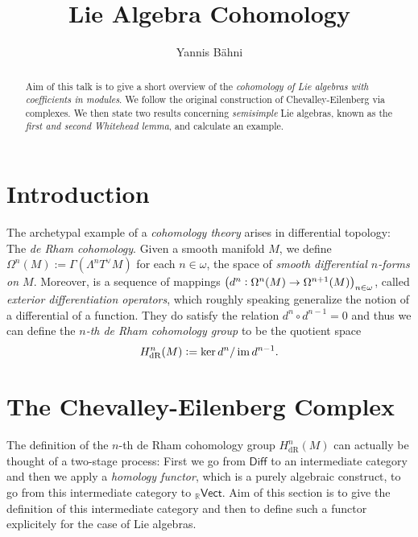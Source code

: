 

\setcounter{section}{1}

\title{Lie Algebra Cohomology}
\author{Yannis B\"{a}hni}
\address[Yannis B\"{a}hni]{University of Zurich, R\"{a}mistrasse 71, 8006 Zurich}



\begin{abstract}
	Aim of this talk is to give a short overview of the \emph{cohomology of Lie algebras with coefficients in modules}. We follow the original construction of Chevalley-Eilenberg via complexes. We then state two results concerning \emph{semisimple} Lie algebras, known as the \emph{first and second Whitehead lemma}, and calculate an example. 
\end{abstract}

\maketitle

\tableofcontents

\section*{Introduction}
The archetypal example of a \emph{cohomology theory} arises in differential topology: The \emph{de Rham cohomology}. Given a smooth manifold $M$, we define $\Omega^n(M) := \Gamma(\Lambda^n T^\vee M)$ for each $n \in \omega$, the space of \emph{smooth differential $n$-forms on $M$}. Moreover, is a sequence of mappings $\del[1]{d^n : \Omega^n(M) \to \Omega^{n + 1}(M)}_{n \in \omega}$, called \emph{exterior differentiation operators}, which roughly speaking generalize the notion of a differential of a function. They do satisfy the relation $d^n \circ d^{n - 1} = 0$ and thus we can define the \emph{$n$-th de Rham cohomology group} to be the quotient space
\begin{equation*}
	H^n_{\mathrm{dR}}(M) := \ker d^n/\operatorname{im} d^{n - 1}.
\end{equation*}

\section*{The Chevalley-Eilenberg Complex}
The definition of the $n$-th de Rham cohomology group $H^n_{\mathrm{dR}}(M)$ can actually be thought of a two-stage process: First we go from $\mathsf{Diff}$ to an intermediate category and then we apply a \emph{homology functor}, which is a purely algebraic construct, to go from this intermediate category to $_{\mathbb{R}}\mathsf{Vect}$. Aim of this section is to give the definition of this intermediate category and then to define such a functor explicitely for the case of Lie algebras.

